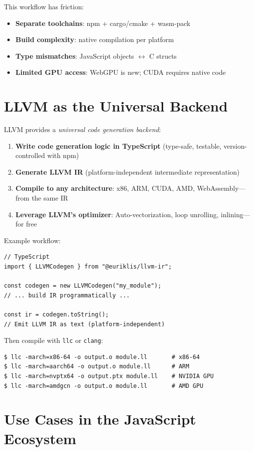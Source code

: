 \documentclass[11pt,oneside]{book}
\begin{document}
This workflow has friction:
\begin{itemize}[noitemsep]
  \item \textbf{Separate toolchains}: npm + cargo/cmake + wasm-pack
  \item \textbf{Build complexity}: native compilation per platform
  \item \textbf{Type mismatches}: JavaScript objects $\leftrightarrow$ C structs
  \item \textbf{Limited GPU access}: WebGPU is new; CUDA requires native code
\end{itemize}

\section{LLVM as the Universal Backend}
LLVM provides a \emph{universal code generation backend}:

\begin{enumerate}[noitemsep]
  \item \textbf{Write code generation logic in TypeScript} (type-safe, testable, version-controlled with npm)
  \item \textbf{Generate LLVM IR} (platform-independent intermediate representation)
  \item \textbf{Compile to any architecture}: x86, ARM, CUDA, AMD, WebAssembly—from the same IR
  \item \textbf{Leverage LLVM's optimizer}: Auto-vectorization, loop unrolling, inlining—for free
\end{enumerate}

Example workflow:
\begin{lstlisting}[style=ts]
// TypeScript
import { LLVMCodegen } from "@euriklis/llvm-ir";

const codegen = new LLVMCodegen("my_module");
// ... build IR programmatically ...

const ir = codegen.toString();
// Emit LLVM IR as text (platform-independent)
\end{lstlisting}

Then compile with \texttt{llc} or \texttt{clang}:
\begin{lstlisting}[style=ir]
$ llc -march=x86-64 -o output.o module.ll       # x86-64
$ llc -march=aarch64 -o output.o module.ll      # ARM
$ llc -march=nvptx64 -o output.ptx module.ll    # NVIDIA GPU
$ llc -march=amdgcn -o output.o module.ll       # AMD GPU
\end{lstlisting}

\section{Use Cases in the JavaScript Ecosystem}
\end{document}
